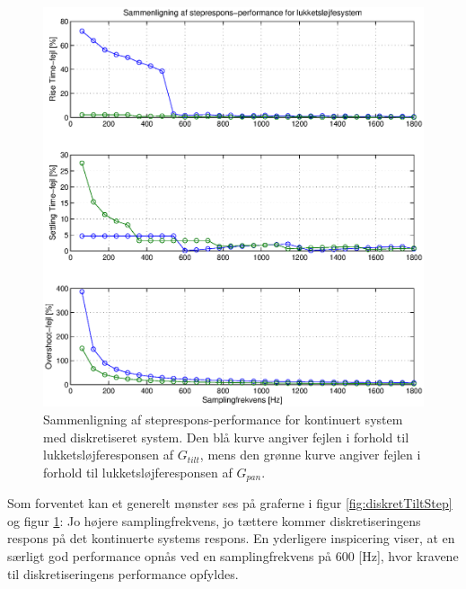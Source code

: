 \begin{figure}[!th]
\centering
	\includegraphics[width=1\textwidth]{./graphics/diskretStepFreq.eps}

\caption[Sammenligning af steprespons-performance for kontinuert system med diskretiseret system $G_{zoh}$]
{Sammenligning af steprespons-performance for kontinuert system med diskretiseret system.
Den blå kurve angiver fejlen i forhold til lukketsløjferesponsen af $G_{tilt}$,
mens den grønne kurve angiver fejlen i forhold til lukketsløjferesponsen af $G_{pan}$.
}


\label{fig:diskretStepFreq}
\end{figure}

Som forventet kan et generelt mønster ses på graferne i figur \ref{fig:diskretTiltStep} og figur \ref{fig:diskretStepFreq}:
Jo højere samplingfrekvens, jo tættere kommer diskretiseringens respons på det kontinuerte systems respons.
En yderligere inspicering viser, at en særligt god performance opnås ved en samplingfrekvens på 600 [Hz],
hvor kravene til diskretiseringens performance opfyldes.

